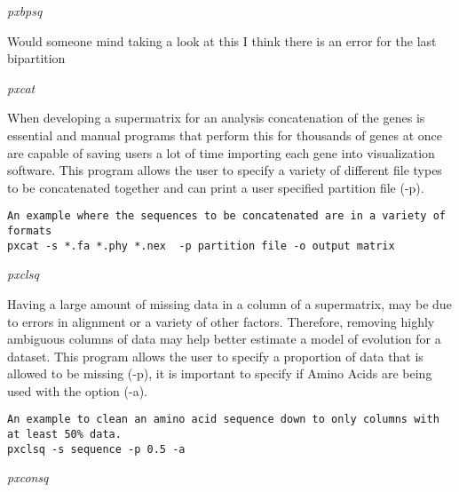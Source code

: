 \documentclass[12pt,letterpaper]{article}
\renewcommand{\subsection}[1]{%
\bigskip
\begin{center}
\begin{large}
\normalfont\itshape #1
\end{large}
\end{center}}
\begin{document}
\subsection{pxbpsq}

Would someone mind taking a look at this I think there is an error for the last bipartition

\subsection{pxcat}

When developing a supermatrix for an analysis concatenation of the genes is essential and manual programs that perform this for thousands of genes at once are capable of saving users a lot of time importing each gene into visualization software. This program allows the user to specify a variety of different file types to be concatenated together and can print a user specified partition file (-p).

\begin{flushleft}
\begin{verbatim}
An example where the sequences to be concatenated are in a variety of formats
pxcat -s *.fa *.phy *.nex  -p partition file -o output matrix
\end{verbatim}
\end{flushleft}

\subsection{pxclsq}

Having a large amount of missing data in a column of a supermatrix, may be due to errors in alignment or a variety of other factors. Therefore, removing highly ambiguous columns of data may help better estimate a model of evolution for a dataset. This program allows the user to specify a proportion of data that is allowed to be missing (-p), it is important to specify if Amino Acids are being used with the option (-a).

\begin{flushleft}
\begin{verbatim}
An example to clean an amino acid sequence down to only columns with at least 50% data.
pxclsq -s sequence -p 0.5 -a
\end{verbatim}
\end{flushleft}

\subsection{pxconsq}
\end{document}

